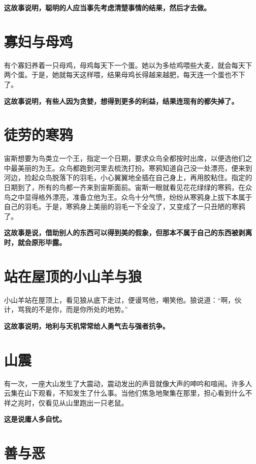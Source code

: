 {\bfseries \color{red}这故事说明，聪明的人应当事先考虑清楚事情的结果，然后才去做。}

\section{寡妇与母鸡}

有个寡妇养着一只母鸡，母鸡每天下一个蛋。她以为多给鸡喂些大麦，就会每天下两个蛋。于是，她就每天这样喂，结果母鸡长得越来越肥，每天连一个蛋也不下了。

{\bfseries \color{red}这故事说明，有些人因为贪婪，想得到更多的利益，结果连现有的都失掉了。}

\section{徒劳的寒鸦}

宙斯想要为鸟类立一个王，指定一个日期，要求众鸟全都按时出席，以便选他们之中最美丽的为王。众鸟都跑到河里去梳洗打扮。寒鸦知道自己没一处漂亮，便来到河边，捡起众鸟脱落下的羽毛，小心翼翼地全插在自己身上，再用胶粘住。指定的日期到了，所有的鸟都一齐来到宙斯面前。宙斯一眼就看见花花绿绿的寒鸦，在众鸟之中显得格外漂亮，准备立他为王。众鸟十分气愤，纷纷从寒鸦身上拔下本属于自己的羽毛。于是，寒鸦身上美丽的羽毛一下全没了，又变成了一只丑陋的寒鸦了。

{\bfseries \color{red}这故事是说，借助别人的东西可以得到美的假象，但那本不属于自己的东西被剥离时，就会原形毕露。}

\section{站在屋顶的小山羊与狼}

小山羊站在屋顶上，看见狼从底下走过，便谩骂他，嘲笑他。狼说道：“啊，伙计，骂我的不是你，而是你所处的地势。”

{\bfseries \color{red}这故事说明，地利与天机常常给人勇气去与强者抗争。}

\section{山震}

有一次，一座大山发生了大震动，震动发出的声音就像大声的呻吟和喧闹。许多人云集在山下观看，不知发生了什么事。当他们焦急地聚集在那里，担心看到什么不祥之兆时，仅看见从山里跑出一只老鼠。

{\bfseries \color{red}这是说庸人多自忧。}

\section{善与恶}

